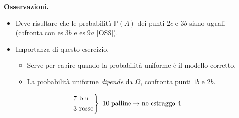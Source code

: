 \textbf{Osservazioni.}
\begin{itemize}
\item Deve risultare che le probabilità $\mathbb{P}( A)$ dei punti $2c$ e $3b$ siano uguali (cofronta con es $3b$ e es $9a$ [OSS]).
\item Importanza di questo esercizio.
\begin{itemize}
\item Serve per capire quando la probabilità uniforme è il modello corretto.
\item La probabilità uniforme \textit{dipende} da $\Omega $, confronta punti $1b$ e $2b$.
\end{itemize}
\end{itemize}
\Soluzione
\begin{equation*}
\begin{drcases}
7\ \text{blu}\\
3\ \text{rosse}
\end{drcases} \ 10\ \text{palline}\rightarrow \text{ne estraggo} \ 4
\end{equation*}
